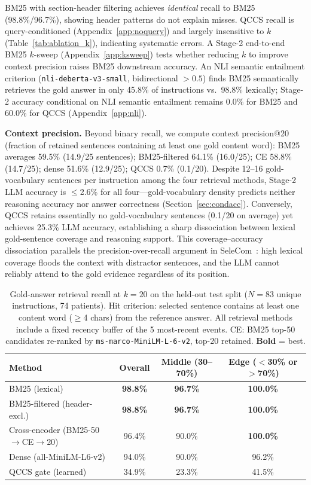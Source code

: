 \documentclass{article}
\begin{document}
BM25 with section-header filtering achieves \emph{identical} recall to BM25
(98.8\%/96.7\%), showing header patterns do not explain misses.
QCCS recall is query-conditioned (Appendix~\ref{app:noquery}) and largely
insensitive to $k$ (Table~\ref{tab:ablation_k}), indicating systematic errors.
A Stage-2 end-to-end BM25 $k$-sweep (Appendix~\ref{app:ksweep}) tests whether
reducing $k$ to improve context precision raises BM25 downstream accuracy.
An NLI semantic entailment criterion (\texttt{nli-deberta-v3-small},
bidirectional $>0.5$) finds BM25 semantically retrieves the gold answer in
only 45.8\% of instructions vs.\ 98.8\% lexically; Stage-2 accuracy conditional
on NLI semantic entailment remains 0.0\% for BM25 and 60.0\% for QCCS
(Appendix~\ref{app:nli}).

\textbf{Context precision.} Beyond binary recall, we compute context precision@20
(fraction of retained sentences containing at least one gold content word):
BM25 averages 59.5\% (14.9/25 sentences); BM25-filtered 64.1\% (16.0/25);
CE 58.8\% (14.7/25); dense 51.6\% (12.9/25); QCCS 0.7\% (0.1/20).
Despite 12--16 gold-vocabulary sentences per instruction among the four
retrieval methods, Stage-2 LLM accuracy is $\leq$2.6\% for all four---gold-vocabulary
density predicts neither reasoning accuracy nor answer correctness
(Section~\ref{sec:condacc}). Conversely, QCCS retains essentially no
gold-vocabulary sentences (0.1/20 on average) yet achieves 25.3\% LLM accuracy,
establishing a sharp dissociation between lexical gold-sentence coverage
and reasoning support. This coverage--accuracy dissociation parallels the
precision-over-recall argument in SeleCom~\cite{liu2026selecom}: high lexical
coverage floods the context with distractor sentences, and the LLM cannot
reliably attend to the gold evidence regardless of its position.

\begin{table}[t]
\centering
\caption{Gold-answer retrieval recall at $k{=}20$ on the held-out test split
  ($N{=}83$ unique instructions, 74 patients). Hit criterion: selected sentence
  contains at least one content word ($\geq$4 chars) from the reference answer.
  All retrieval methods include a fixed recency buffer of the 5 most-recent events.
  CE: BM25 top-50 candidates re-ranked by \texttt{ms-marco-MiniLM-L-6-v2}, top-20 retained.
  \textbf{Bold} = best.}
\label{tab:qccsgate}
\small
\begin{tabular}{@{}lccc@{}}
\toprule
Method & Overall & Middle (30--70\%) & Edge ($<$30\% or $>$70\%) \\
\midrule
BM25 (lexical) & \textbf{98.8\%} & \textbf{96.7\%} & \textbf{100.0\%} \\
BM25-filtered (header-excl.) & \textbf{98.8\%} & \textbf{96.7\%} & \textbf{100.0\%} \\
Cross-encoder (BM25-50$\to$CE$\to$20) & 96.4\% & 90.0\% & \textbf{100.0\%} \\
Dense (all-MiniLM-L6-v2) & 94.0\% & 90.0\% & 96.2\% \\
QCCS gate (learned) & 34.9\% & 23.3\% & 41.5\% \\
\bottomrule
\end{tabular}
\end{table}
\end{document}
